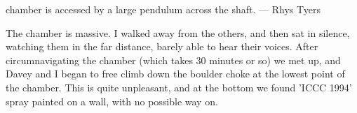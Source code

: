 \begin{marginfigure}
\label{Ta Mokra}
\caption{   \protect{} chamber is accessed by a large pendulum across the \protect{} shaft. --- Rhys Tyers}
\end{marginfigure}

The chamber is massive. I walked away from the others, and then sat in silence, watching them in the far distance, barely able to hear their voices. After circumnavigating the chamber (which takes 30 minutes or so) we met up, and Davey and I began to free climb down the boulder choke at the lowest point of the chamber. This is quite unpleasant, and at the bottom we found 'ICCC 1994' spray painted on a wall, with no possible way on.

